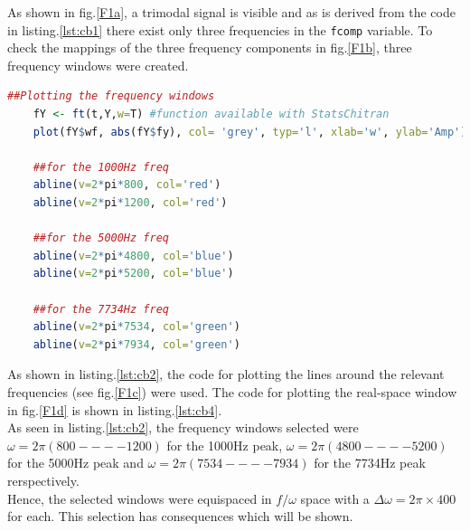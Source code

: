 \documentclass{article}
\begin{document}
As shown in fig.\ref{F1a}, a trimodal signal is visible and as is derived from the code in listing.\ref{lst:cb1} there exist only three frequencies in the  \lstinline[language=R]|fcomp| variable.
To check the mappings of the three frequency components in fig.\ref{F1b}, three frequency windows were created.
\pagebreak
 \begin{lstlisting}[language=R, label={lst:cb2}, caption={code for plotting the three frequency windows in fig.\ref{F1c}}, captionpos=b]
	##Plotting the frequency windows
	fY <- ft(t,Y,w=T) #function available with StatsChitran
	plot(fY$wf, abs(fY$fy), col= 'grey', typ='l', xlab='w', ylab='Amp')
	
	##for the 1000Hz freq
	abline(v=2*pi*800, col='red')
	abline(v=2*pi*1200, col='red')
	
	##for the 5000Hz freq
	abline(v=2*pi*4800, col='blue')
	abline(v=2*pi*5200, col='blue')
	
	##for the 7734Hz freq
	abline(v=2*pi*7534, col='green')
	abline(v=2*pi*7934, col='green')
\end{lstlisting}
As shown in listing.\ref{lst:cb2}, the code for plotting the lines around the relevant frequencies (see fig.\ref{F1c}) were used. The code for plotting the real-space window in fig.\ref{F1d} is shown in listing.\ref{lst:cb4}.\\
 As seen in listing.\ref{lst:cb2}, the frequency windows selected were $\omega = 2\pi(800 ---- 1200)$ for the 1000\si{Hz} peak, $\omega = 2\pi(4800 ---- 5200)$ for the 5000\si{Hz} peak and $\omega = 2\pi(7534 ---- 7934)$ for the 7734\si{Hz} peak rerspectively.\\
 Hence, the selected windows were equispaced in $f/\omega$ space with a $\Delta\omega = 2\pi \times 400$ for each. This selection has consequences which will be shown.
\end{document}

